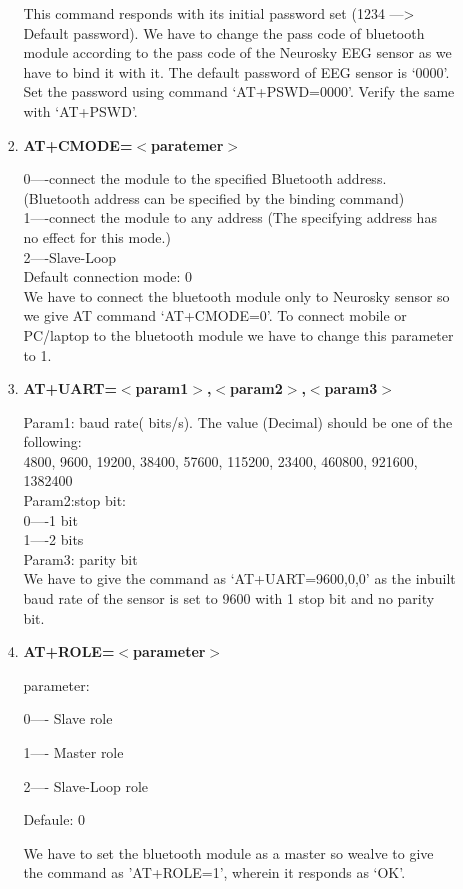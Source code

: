 \documentclass[12pt]{article}
\begin{document}
\begin{enumerate}
\begin{enumerate}
\begin{enumerate}
This command responds with its initial password set (1234 ---> Default password).  We have to change the pass code of bluetooth module according to the pass code of the Neurosky EEG sensor as we have to bind it with it. The default password of EEG sensor is ‘0000’. Set the password using command ‘AT+PSWD=0000’. Verify the same with ‘AT+PSWD’.\\


	\item \textbf{AT+CMODE=$<$paratemer$>$}


0----connect the module to the specified Bluetooth address. (Bluetooth address can be specified by the binding command)\\
1----connect the module to any address (The specifying address has no effect for this mode.)\\
2----Slave-Loop\\
Default connection mode: 0\\
We have to connect the bluetooth module only to Neurosky sensor so we give AT command ‘AT+CMODE=0’. To connect mobile or PC/laptop to the bluetooth module we have to change this parameter to 1.
\\

	\item \textbf{AT+UART=$<$param1$>$,$<$param2$>$,$<$param3$>$}


Param1: baud rate( bits/s). The value (Decimal) should be one of the following:\\
4800, 9600, 19200, 38400, 57600, 115200, 23400, 460800, 921600, 1382400\\
Param2:stop bit:\\
0----1 bit\\
1----2 bits\\
Param3: parity bit\\
We have to give the command as ‘AT+UART=9600,0,0’ as the inbuilt baud rate of the sensor is set to 9600 with 1 stop bit and no parity bit.\\



	\item \textbf{AT+ROLE=$<$parameter$>$}


parameter:

0---- Slave role

1---- Master role

2---- Slave-Loop role

Defaule: 0

We have to set the bluetooth module as a master so wealve to give the command as 'AT+ROLE=1', wherein it responds as `OK'.\\
  


\end{enumerate}
\end{enumerate}
\end{enumerate}
\end{document}
